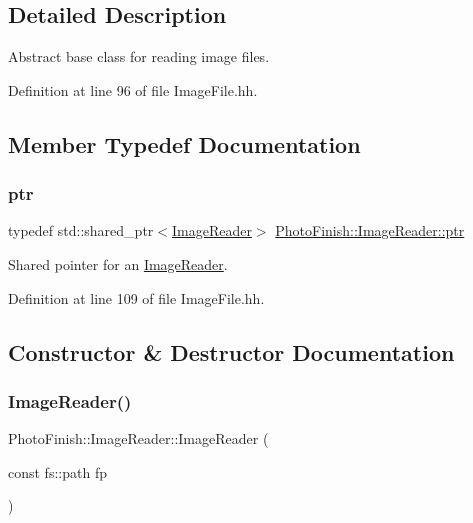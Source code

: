\subsection{Detailed Description}
Abstract base class for reading image files. 

Definition at line 96 of file Image\+File.\+hh.



\subsection{Member Typedef Documentation}
\mbox{\label{class_photo_finish_1_1_image_reader_a4f077d55ff971217578dc51db00715aa}} 
\subsubsection{\texorpdfstring{ptr}{ptr}}
{\footnotesize\ttfamily typedef std\+::shared\+\_\+ptr$<$\hyperlink{class_photo_finish_1_1_image_reader}{Image\+Reader}$>$ \hyperlink{class_photo_finish_1_1_image_reader_a4f077d55ff971217578dc51db00715aa}{Photo\+Finish\+::\+Image\+Reader\+::ptr}}



Shared pointer for an \hyperlink{class_photo_finish_1_1_image_reader}{Image\+Reader}. 



Definition at line 109 of file Image\+File.\+hh.



\subsection{Constructor \& Destructor Documentation}
\mbox{\label{class_photo_finish_1_1_image_reader_a9ce29baef024a887afc7a878fa6c71b5}} 
\subsubsection{\texorpdfstring{Image\+Reader()}{ImageReader()}}
{\footnotesize\ttfamily Photo\+Finish\+::\+Image\+Reader\+::\+Image\+Reader (\begin{DoxyParamCaption}\item[{const fs\+::path}]{fp }\end{DoxyParamCaption})\hspace{0.3cm}{\ttfamily [protected]}}



